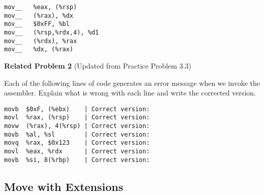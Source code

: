 \documentclass{article}
\begin{document}
\vspace{10pt}

\begin{lstlisting}[basicstyle=\ttfamily, frame=none]
mov__   %eax, (%rsp)        
mov__   (%rax), %dx         
mov__   $0xFF, %bl          
mov__   (%rsp,%rdx,4), %d1  
mov__   (%rdx), %rax        
mov__   %dx, (%rax)        
\end{lstlisting}

\noindent\textbf{Related Problem 2} (Updated from Practice Problem 3.3)

\vspace{5pt}

Each of the following lines of code generates an error message when we invoke the assembler. Explain what is wrong with each line and write the corrected version.

\vspace{10pt}

\begin{lstlisting}[basicstyle=\ttfamily, frame=none]
movb  $0xF, (%ebx)    | Correct version: 
movl  %rax, (%rsp)    | Correct version:
movw  (%rax), 4(%rsp) | Correct version:
movb  %al, %sl        | Correct version:
movq  %rax, $0x123    | Correct version:
movl  %eax, %rdx      | Correct version:
movb  %si, 8(%rbp)    | Correct version:
\end{lstlisting}

\clearpage %

\subsection{Move with Extensions}
\end{document}
